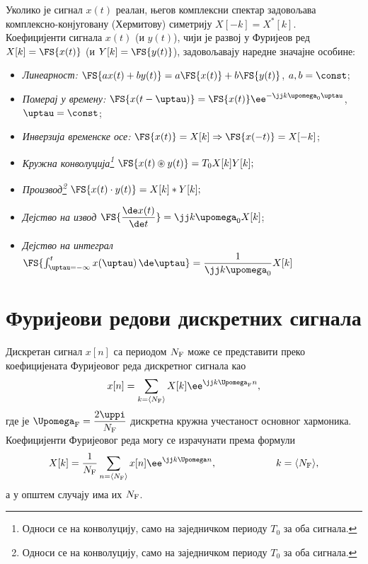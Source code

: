 Уколико је сигнал $x(t)$ реалан, његов комплексни спектар задовољава комплексно-конјуговану (Хермитову) симетрију 
$X[-k] = X^{\ast}[k]$. \\[1mm]

Коефицијенти сигнала $x(t)$ (и $y(t)$), чији је развој у Фуријеов ред
$X[k] = \FS{x(t)}$ (и $Y[k] = \FS{y(t)}$),
задовољавају наредне значајне особине: 
\begin{itemize}\itemsep0pt
    \item \emph{Линеарност:}  $\FS{ax(t) + by(t)} = a \FS{x(t)} + b \FS{y(t)}$, $a,b = \const$;
    \item \emph{Померај у времену:} $ \FS{x(t-\uptau)} = \FS{x(t)} \ee^{-\jj k \upomega_{\rm 0} \uptau}$, $\uptau = \const$;
    \item \emph{Инверзија временске осе:} $\FS{x(t)} = X[k] \Rightarrow \FS{x(-t)} = X[-k] $;
    \item \emph{Кружна конволуција\footnote{Односи се на конволуцију, само на заједничком периоду $T_0$ за оба сигнала.}}
    $
    \FS{x(t) \circledast y(t)} = T_0 X[k] Y[k];
    $
    \item \emph{Производ\footnote{Односи се на конволуцију, само на заједничком периоду $T_0$ за оба сигнала.}}
    $
    \FS{x(t) \cdot y(t)} = X[k] \ast Y[k];
    $
    \item \emph{Дејство на извод} $\FS{ \dfrac{\de x(t)}{\de t} } = \jj k \upomega_0 X[k]$;
    \item \emph{Дејство на интеграл} $\FS{ \int_{\uptau = -\infty}^t x(\uptau) \, \de \uptau } = \dfrac{1}{\jj k \upomega_0} X[k]$ 
\end{itemize}


\section*{Фуријеови редови дискретних сигнала}

Дискретан сигнал $x[n]$ са периодом $N_{\rm F}$ може се представити преко коефицијената Фуријеовог 
реда дискретног сигнала као
\begin{eqnarray}
    x[n] = \sum_{k = \langle N_{\rm F} \rangle } X[k] \ee^{ \jj k \Upomega_{\rm F} n }, 
\end{eqnarray}
где је $\Upomega_{\rm F} = \dfrac{2\uppi}{N_{\rm F}}$ дискретна кружна учестаност основног хармоника. Коефицијенти 
Фуријеовог реда могу се израчунати према формули 
\begin{equation}
    X[k] = \dfrac{1}{N_{\rm F}} \sum_{n = \langle N_{\rm F} \rangle} x[n] \ee^{\jj k \Upomega n}, 
    \qquad\qquad\qquad
    k = \langle N_{\rm F} \rangle,
\end{equation}
а у општем случају има их $N_{\rm F}$. 


